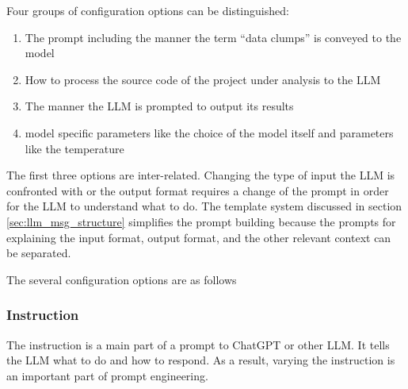 Four groups of configuration options can be distinguished:
\begin{enumerate}
    \item The prompt including the manner the term \enquote{data clumps} is conveyed to the model
    \item How to process the source code of the project under analysis to the \ac{LLM}
    \item The manner the LLM is prompted to output its results
    \item model specific parameters like the choice of the model itself and parameters like the temperature
\end{enumerate}

The first three options are inter-related. Changing the type of input the LLM is confronted with or the output format requires a change of the prompt in order for the LLM to understand what to do. The template system discussed in section \ref{sec:llm_msg_structure} simplifies the prompt building because the prompts for explaining the input format, output format, and the other relevant context can be separated.

The several configuration options are as follows















\begin{comment}
In this section, the results of some of these experiments will be discussed.  As repeatedly noted, these experiments are not always reproducible and therefore are only to some extent helpful. In all cases, ChatGPT is asked to output in \ac{JSON} to have a consistent format.

In each experiment, different parameters of the input are adjusted. Each these parameters has an influence of the quality of the output:

\begin{itemize}
    \item Instruction
    \item Model
    \item Data format
    \item Data size
    \item Temperature
\end{itemize}
\end{comment}
\subsubsection{Instruction}\label{sec:llm_instruction}
The instruction is a main part of a prompt to ChatGPT or other \ac{LLM}. It tells the  \ac{LLM} what to do and how to respond. As a result, varying the instruction is an important part of prompt engineering. \newline




